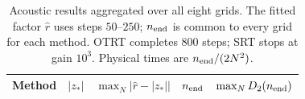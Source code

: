 \begin{table}[htbp]

\centering
\caption{Acoustic results aggregated over all eight grids. The fitted factor $\widehat r$ uses steps $50$--$250$; $n_{\rm end}$ is common to every grid for each method. OTRT completes 800 steps; SRT stops at gain $10^3$. Physical times are $n_{\rm end}/(2N^2)$.}
\label{tab:numerical-periodic-acoustic}
\begingroup
\small
\begin{tabular}{@{}lrrrr@{}}
\toprule
Method & $|z_*|$ & $\max_N|\widehat r-|z_*||$ & $n_{\rm end}$ & $\max_N D_2(n_{\rm end})$\\
\midrule
\bottomrule
\end{tabular}
\endgroup
\end{table}
